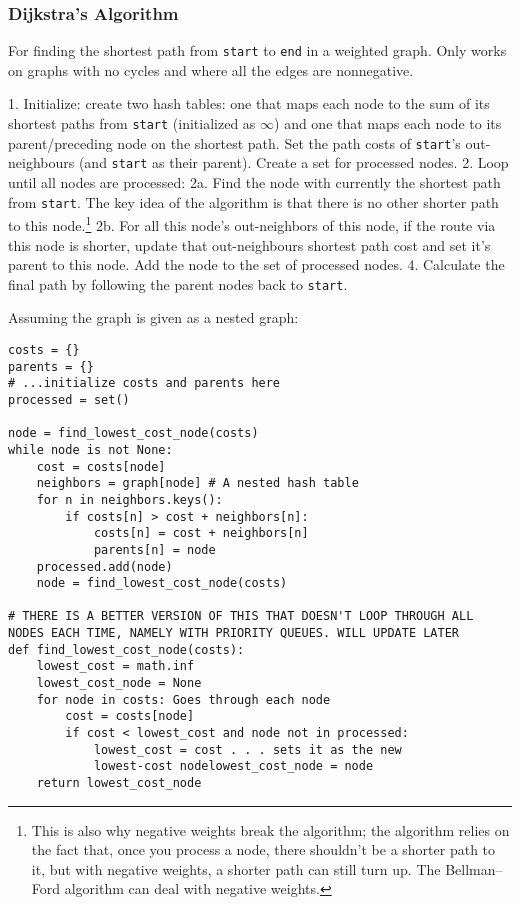 \documentclass[8pt, table, xcdraw]{article}%
\begin{document}
\subsubsection{Dijkstra's Algorithm}

For finding the shortest path from \lstinline{start} to \lstinline{end} in a weighted graph. Only works on graphs with no cycles and where all the edges are nonnegative.

1. Initialize: create two hash tables: one that maps each node to the sum of its shortest paths from \lstinline{start} (initialized as $\infty$) and one that maps each node to its parent/preceding node on the shortest path. Set the path costs of \lstinline{start}'s out-neighbours (and \lstinline{start} as their parent). Create a set for processed nodes.
2. Loop until all nodes are processed:
    2a. Find the node with currently the shortest path from \lstinline{start}. The key idea of the algorithm is that there is no other shorter path to this node.\footnote{This is also why negative weights break the algorithm; the algorithm relies on the fact that, once you process a node, there shouldn't be a shorter path to it, but with negative weights, a shorter path can still turn up. The Bellman–Ford algorithm can deal with negative weights.}
    2b. For all this node's out-neighbors of this node, if the route via this node is shorter, update that out-neighbours shortest path cost and set it's parent to this node. Add the node to the set of processed nodes.
4. Calculate the final path by following the parent nodes back to \lstinline{start}.

Assuming the graph is given as a nested graph:

\begin{lstlisting}
costs = {}
parents = {}
# ...initialize costs and parents here
processed = set()

node = find_lowest_cost_node(costs)
while node is not None:
    cost = costs[node]
    neighbors = graph[node] # A nested hash table
    for n in neighbors.keys():
        if costs[n] > cost + neighbors[n]:
            costs[n] = cost + neighbors[n]
            parents[n] = node
    processed.add(node)
    node = find_lowest_cost_node(costs)

# THERE IS A BETTER VERSION OF THIS THAT DOESN'T LOOP THROUGH ALL NODES EACH TIME, NAMELY WITH PRIORITY QUEUES. WILL UPDATE LATER
def find_lowest_cost_node(costs):
    lowest_cost = math.inf
    lowest_cost_node = None
    for node in costs: Goes through each node
        cost = costs[node]
        if cost < lowest_cost and node not in processed:
            lowest_cost = cost . . . sets it as the new
            lowest-cost nodelowest_cost_node = node
    return lowest_cost_node
\end{lstlisting}
\end{document}
